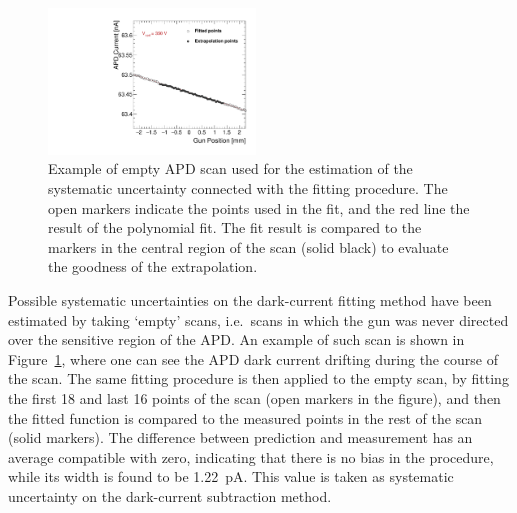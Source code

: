 \documentclass[12p]{paper}
\begin{document}
\begin{figure}[tb]
  \centering
\includegraphics[width=0.49\textwidth]{figures/apdSyst.pdf}
 \caption{Example of empty APD scan used for the estimation of the systematic uncertainty connected with the fitting procedure. The open markers indicate the points used in the fit, and the red line the result of the polynomial fit. The fit result is compared to the markers in the central region of the scan (solid black) to evaluate the goodness of the extrapolation.
  \label{fig:apd_syst}}
\end{figure}

Possible systematic uncertainties on the dark-current fitting method have been estimated by taking `empty' scans, i.e.~scans in which the gun was never directed over the sensitive region of the APD. An example of such scan is shown in Figure~\ref{fig:apd_syst}, where one can see the APD dark current drifting during the course of the scan. The same fitting procedure is then applied to the empty scan, by fitting the first 18 and last 16 points of the scan (open markers in the figure), and then the fitted function is compared to the measured points in the rest of the scan (solid markers). The difference between prediction and measurement has an average compatible with zero, indicating that there is no bias in the procedure, while its width is found to be 1.22~pA. This value is taken as systematic uncertainty on the dark-current subtraction method. 

\end{document}
